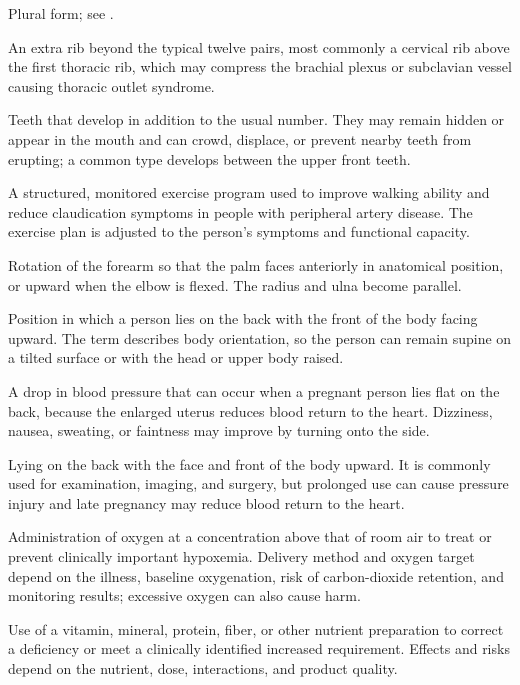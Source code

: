  Plural form; see .

 An extra rib beyond the typical twelve pairs, most commonly a cervical rib above the
first thoracic rib, which may compress the brachial plexus or subclavian vessel causing
thoracic outlet syndrome.

 Teeth that develop in addition to the usual number. They may remain hidden or appear in the mouth and can crowd, displace, or prevent nearby teeth from erupting; a common type develops between the upper front teeth.

 A structured, monitored exercise program used to improve walking ability and
reduce claudication symptoms in people with peripheral artery disease. The exercise plan
is adjusted to the person’s symptoms and functional capacity.

 Rotation of the forearm so that the palm faces anteriorly in anatomical position, or upward when the elbow is flexed. The radius and ulna become parallel.

 Position in which a person lies on the back with the front of the body facing upward. The term describes body orientation, so the person can remain supine on a tilted surface or with the head or upper body raised.

 A drop in blood pressure that can occur when a pregnant person lies flat on the back, because the enlarged uterus reduces blood return to the heart. Dizziness, nausea, sweating, or faintness may improve by turning onto the side.

 Lying on the back with the face and front of the body upward. It is commonly used for examination, imaging, and surgery, but prolonged use can cause pressure injury and late pregnancy may reduce blood return to the heart.

 Administration of oxygen at a concentration above that of room air to treat or prevent
clinically important hypoxemia. Delivery method and oxygen target depend on the illness,
baseline oxygenation, risk of carbon-dioxide retention, and monitoring results; excessive
oxygen can also cause harm.

 Use of a vitamin, mineral, protein, fiber, or other nutrient preparation to correct a
deficiency or meet a clinically identified increased requirement. Effects and risks depend
on the nutrient, dose, interactions, and product quality.

